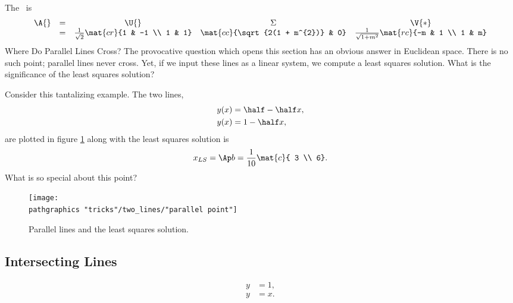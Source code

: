 The \asvd \ is
%
  \begin{equation*}   %
    \begin{array}{ccccc}
      \A{} & = & \U{} & \Sigma & \V{*} \\
        & = & \frac{1} {\sqrt{2}} \mat{cr}{1 & -1 \\ 1 & 1} 
            & \mat{cc}{\sqrt{2(1 + m^{2})} & 0}
            & \frac{1} {\sqrt{1 + m^{2}}} \mat{rc}{-m & 1 \\ 1 & m}
    \end{array}
  \end{equation*}
Where Do Parallel Lines Cross? The provocative question which opens this section has an obvious answer in Euclidean space. There is no such point; parallel lines never cross. Yet, if we input these lines as a linear system, we compute a least squares solution. What is the significance of the least squares solution?

Consider this tantalizing example. The two lines,
  \begin{equation*}   %
    \begin{split}
      y(x) &= \half - \half x, \\
      y(x) &= 1 - \half x,
    \end{split}
  \end{equation*}
are plotted in figure \ref{fig:tantalizing} along with the least squares solution is 
  \begin{equation*}   %
      x_{LS} = \Ap b = \frac{1}{10}\mat{c}{ 3 \\ 6}.
  \end{equation*}
What is so special about this point?
\begin{figure}[htbp] %
   \centering
     \texttt{[image: \\pathgraphics "tricks"/two\_lines/"parallel point"]} 
   \caption{Parallel lines and the least squares solution.}
   \label{fig:tantalizing}
\end{figure}

\subsection{Intersecting Lines}
  \begin{equation*}   %
   \begin{split}
      y &= 1, \\
      y &= x .
   \end{split}
  \end{equation*}

